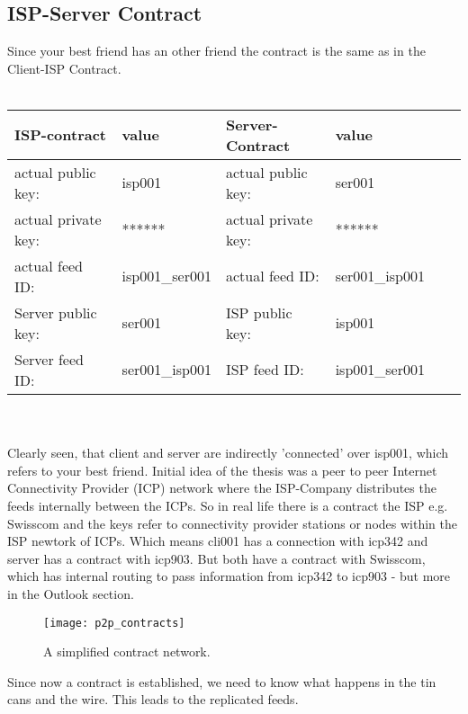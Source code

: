 \subsection{ISP-Server Contract}
Since your best friend has an other friend the contract is the same as in the Client-ISP Contract.\\\\
\begin{tabular}{llllll} \toprule
    ISP-contract&value&Server-Contract&value\\ \midrule
    actual public key:& isp001 &  actual public key: &ser001   \\ 
    actual private key:& ****** & actual private key:& ******  \\
    actual feed ID:& isp001\_ser001 &actual feed ID:&ser001\_isp001\\ 
    Server public key:&ser001&ISP public key:&isp001\\
    Server feed ID:&ser001\_isp001&ISP feed ID:&isp001\_ser001\\\bottomrule
\end{tabular}
\\\\
Clearly seen, that client and server are indirectly 'connected' over isp001, which refers to your best friend. Initial idea of the thesis was a peer to peer Internet Connectivity Provider (ICP) network where the ISP-Company distributes the feeds internally between the ICPs. So in real life there is a contract the ISP e.g. Swisscom and the keys refer to connectivity provider stations or nodes within the ISP newtork of ICPs. Which means cli001 has a connection with icp342 and server has a contract with icp903. But both have a contract with Swisscom, which has internal routing to pass information from icp342 to icp903 - but more in the Outlook section.
\\
\begin{figure}
    \centering
    \texttt{[image: p2p\_contracts]}
    \caption{A simplified contract network.}
    \label{fig:contract_network}
\end{figure}



Since now a contract is established, we need to know what happens in the tin cans and the wire. This leads to the replicated feeds.

\pagebreak

